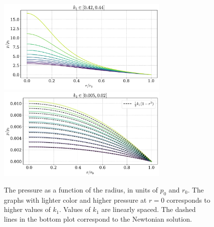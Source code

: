 \begin{figure}[h]
    \centering
    \includegraphics[width=0.75\textwidth]{../scripts/figurer/incompressible.pdf}
    \includegraphics[width=0.75\textwidth]{../scripts/figurer/incompressible_newt.pdf}
    \caption{
        The pressure as a function of the radius, in units of $p_0$ and $r_0$. 
        The graphs with lighter color and higher pressure at $r = 0$ corresponds to higher values of $k_1$. 
        Values of $k_1$ are linearly spaced. 
        The dashed lines in the bottom plot correspond to the Newtonian solution.
        }
    \label{fig: pressure incompressible fluid}
\end{figure}


